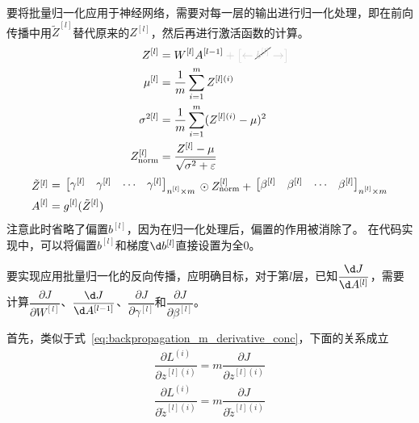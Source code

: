 要将批量归一化应用于神经网络，需要对每一层的输出进行归一化处理，即在前向传播中用$\tilde{Z}^{[l]}$替代原来的$Z^{[l]}$，然后再进行激活函数的计算。
\begin{align}
    Z^{[l]} &= W^{[l]}A^{[l-1]} \textcolor{lightgray}{\vphantom{1}+ \bigl[ \leftarrow \vphantom{1}} \cancel{\textcolor{lightgray}{b^{[l]}}} \textcolor{lightgray}{\vphantom{1} \rightarrow \bigr]} 
    \label{eq:batch_norm_zl} \\
    \mu^{[l]} &= \frac{1}{m}\sum_{i=1}^m Z^{[l](i)} 
    \label{eq:batch_norm_mu} \\
    \sigma^{2[l]} &= \frac{1}{m}\sum_{i=1}^m (Z^{[l](i)} - \mu)^2 
    \label{eq:batch_norm_sigma} \\
    Z^{[l]}_{\mathrm{norm}} &= \frac{Z^{[l]} - \mu}{\sqrt{\sigma^2 + \varepsilon}}
    \label{eq:batch_norm_znorm}
\end{align}
\begin{align}
    \vcenter{\hbox{$\tilde{Z}^{[l]}$}} &\vcenter{\hbox{$\vphantom{1}=\vphantom{1}$}} \begin{bmatrix} \gamma^{[l]} & \gamma^{[l]} & \cdots & \gamma^{[l]}\end{bmatrix}_{\substack{\scriptstyle n^{[l]}\times m}} \vcenter{\hbox{$\vphantom{1}\odot Z^{[l]}_{\mathrm{norm}} +\vphantom{1}$}} \begin{bmatrix} \beta^{[l]} & \beta^{[l]} & \cdots & \beta^{[l]} \end{bmatrix}_{\substack{\scriptstyle n^{[l]}\times m}} 
    \label{eq:batch_norm_ztilde} \\
    A^{[l]} &= g^{[l]}(\tilde{Z}^{[l]})
    \label{eq:batch_norm_al}
\end{align}
注意此时省略了偏置$b^{[l]}$，因为在归一化处理后，偏置的作用被消除了。
在代码实现中，可以将偏置$b^{[l]}$和梯度$\d b^{[l]}$直接设置为全0。

要实现应用批量归一化的反向传播，应明确目标，对于第$l$层，已知$\dfrac{\d J}{\d A^{[l]}}$，需要计算$\dfrac{\partial J}{\partial W^{[l]}}$、$\dfrac{\d J}{\d A^{[l-1]}}$、$\dfrac{\partial J}{\partial \gamma^{[l]}}$和$\dfrac{\partial J}{\partial \beta^{[l]}}$。

首先，类似于式~\eqref{eq:backpropagation_m_derivative_conc}，下面的关系成立
\begin{align}
    \dfrac{\partial L^{(i)}}{\partial z^{[l](i)}} = m \dfrac{\partial J}{\partial z^{[l](i)}} 
    \label{eq:batch_norm_zl_m} \\
    \dfrac{\partial L^{(i)}}{\partial \tilde{z}^{[l](i)}} = m \dfrac{\partial J}{\partial \tilde{z}^{[l](i)}}
    \label{eq:batch_norm_ztilde_m}
\end{align}

